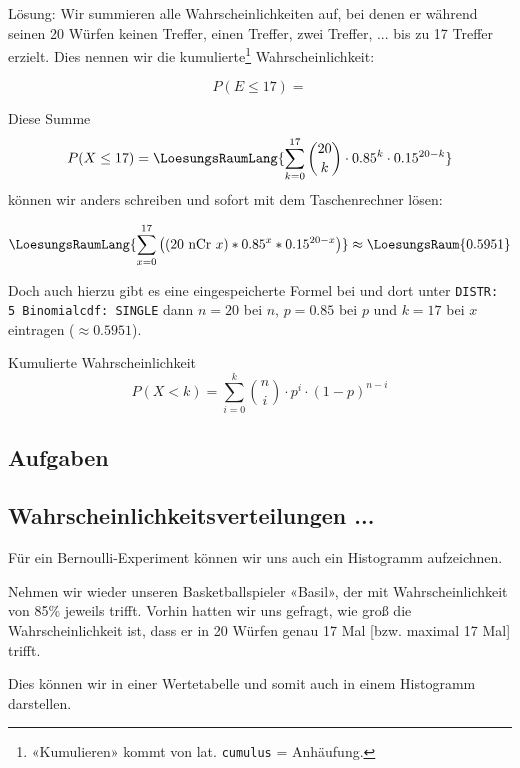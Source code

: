 Lösung: Wir summieren alle Wahrscheinlichkeiten auf, bei denen er
während seinen 20 Würfen
keinen Treffer, einen Treffer, zwei Treffer, ... bis zu 17 Treffer
erzielt. Dies nennen wir die kumulierte\footnote{«Kumulieren» kommt von
  lat. \texttt{cumulus} = Anhäufung.} Wahrscheinlichkeit:

$$P(E\le 17) = $$

Diese Summe
$$P(X\le 17) = \LoesungsRaumLang{\sum_{k=0}^{17} {20 \choose k} \cdot 0.85^k \cdot 0.15^{20-k}}$$
können wir anders schreiben und sofort mit dem
Taschenrechner lösen:

$$\LoesungsRaumLang{\sum_{x=0}^{17}\left(( 20 \textrm{\,\,nCr\,\,} x ) * 0.85^x *
0.15^{20-x}\right)} \approx \LoesungsRaum{0.5951}$$


Doch auch hierzu gibt es eine eingespeicherte Formel
bei
 und dort unter \texttt{DISTR: 5
  Binomialcdf: SINGLE} dann $n=20$ bei $n$, $p=0.85$ bei $p$ und
$k=17$ bei $x$ eintragen ($\approx 0.5951$).

\begin{gesetz}{Kumulierte Wahrscheinlichkeit}{}
  $$P(X < k) = \sum_{i=0}^k {n \choose i} \cdot{} p^i \cdot{} (1-p)^{n-i}$$
  \end{gesetz}

\newpage
\subsection*{Aufgaben}

\newpage

\subsection{Wahrscheinlichkeitsverteilungen ...}

Für ein Bernoulli-Experiment können wir uns auch ein Histogramm aufzeichnen.

Nehmen wir wieder unseren Basketballspieler «Basil», der mit Wahrscheinlichkeit von 85\% jeweils trifft. Vorhin hatten wir uns gefragt, wie groß die Wahrscheinlichkeit ist, dass er in 20 Würfen genau 17 Mal [bzw. maximal 17 Mal] trifft.

Dies können wir in einer Wertetabelle und somit auch in einem Histogramm darstellen.
\newpage


